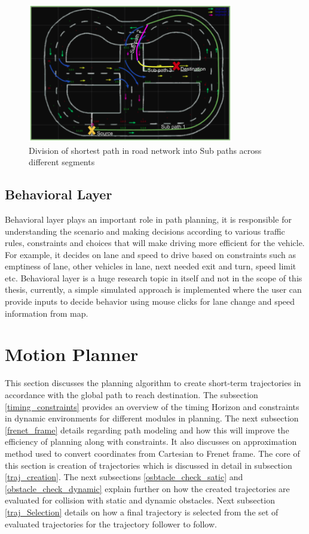 \begin{figure}
    \centering
    \includegraphics[width=0.8\textwidth]{Images/path_Segmentation.png}
    \caption{Division of shortest path in road network into Sub paths across different segments}
    \label{path_Segmentation}
\end{figure}

\subsection{Behavioral Layer}
Behavioral layer plays an important role in path planning, it is responsible for understanding the scenario and making decisions according to various traffic rules, constraints and choices that will make driving more efficient for the vehicle. For example, it decides on lane and speed to drive based on constraints such as emptiness of lane, other vehicles in lane, next needed exit and turn, speed limit etc. Behavioral layer is a huge research topic in itself and not in the scope of this thesis, currently, a simple simulated approach is implemented where the user can provide inputs to decide behavior using mouse clicks for lane change and speed information from map.

\section{Motion Planner} \label{motion_planner}

This section discusses the planning algorithm to create short-term trajectories in accordance with the global path to reach destination. The subsection \ref{timing_constraints} provides an overview of the timing Horizon and constraints in dynamic environments for different modules in planning. The next subsection \ref{frenet_frame} details regarding path modeling and how this will improve the efficiency of planning along with constraints. It also discusses on approximation method used to convert coordinates from Cartesian to Frenet frame. The core of this section is creation of trajectories which is discussed in detail in subsection \ref{traj_creation}. The next subsections \ref{osbtacle_check_satic} and \ref{obstacle_check_dynamic} explain further on how the created trajectories are evaluated for collision with static and dynamic obstacles. Next subsection \ref{traj_Selection} details on how a final trajectory is selected from the set of evaluated trajectories for the trajectory follower to follow.


